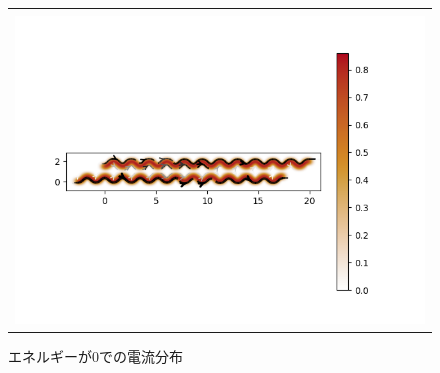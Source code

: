\begin{figure}[htpb]
\begin{tabular}{c}
    \\
    \\

    \begin{minipage}{0.50\hsize}
    \centering
    \includegraphics[keepaspectratio, scale=0.55]{./data/w2/w2-j_zero.png}
    \caption{エネルギーが0での電流分布}
    \label{j:z}
    \end{minipage}
  \end{tabular}
\end{figure}


